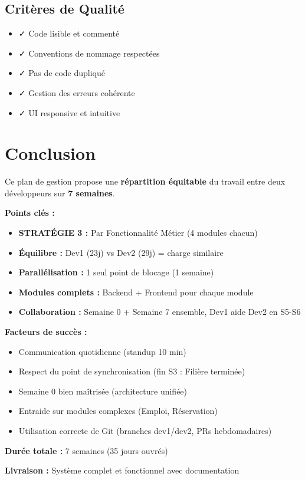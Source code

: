 \documentclass[12pt,a4paper]{article}
\begin{document}
\subsection{Critères de Qualité}

\begin{itemize}
    \item ✓ Code lisible et commenté
    \item ✓ Conventions de nommage respectées
    \item ✓ Pas de code dupliqué
    \item ✓ Gestion des erreurs cohérente
    \item ✓ UI responsive et intuitive
\end{itemize}

\newpage

\section{Conclusion}

Ce plan de gestion propose une \textbf{répartition équitable} du travail entre deux développeurs sur \textbf{7 semaines}.

\textbf{Points clés :}
\begin{itemize}
    \item \textbf{STRATÉGIE 3 :} Par Fonctionnalité Métier (4 modules chacun)
    \item \textbf{Équilibre :} Dev1 (23j) vs Dev2 (29j) = charge similaire
    \item \textbf{Parallélisation :} 1 seul point de blocage (1 semaine)
    \item \textbf{Modules complets :} Backend + Frontend pour chaque module
    \item \textbf{Collaboration :} Semaine 0 + Semaine 7 ensemble, Dev1 aide Dev2 en S5-S6
\end{itemize}

\textbf{Facteurs de succès :}
\begin{itemize}
    \item Communication quotidienne (standup 10 min)
    \item Respect du point de synchronisation (fin S3 : Filière terminée)
    \item Semaine 0 bien maîtrisée (architecture unifiée)
    \item Entraide sur modules complexes (Emploi, Réservation)
    \item Utilisation correcte de Git (branches dev1/dev2, PRs hebdomadaires)
\end{itemize}

\textbf{Durée totale :} 7 semaines (35 jours ouvrés)

\textbf{Livraison :} Système complet et fonctionnel avec documentation
\end{document}
